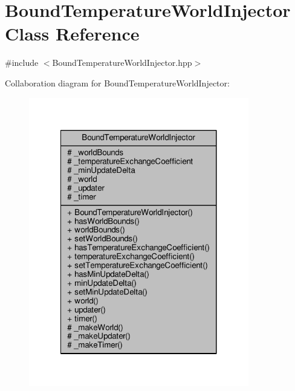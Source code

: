 \hypertarget{class_bound_temperature_world_injector}{\section{Bound\-Temperature\-World\-Injector Class Reference}
\label{class_bound_temperature_world_injector}
}


{\ttfamily \#include $<$Bound\-Temperature\-World\-Injector.\-hpp$>$}



Collaboration diagram for Bound\-Temperature\-World\-Injector\-:
\nopagebreak
\begin{figure}[H]
\begin{center}
\leavevmode
\includegraphics[width=272pt]{class_bound_temperature_world_injector__coll__graph}
\end{center}
\end{figure}
